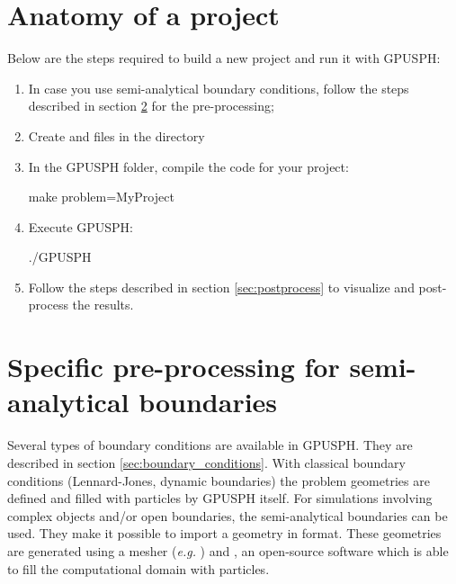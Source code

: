 \documentclass[12pt]{memoir}
\begin{document}

\section{Anatomy of a project}

Below are the steps required to build a new project and run it with GPUSPH:
\begin{enumerate}
\item In case you use semi-analytical boundary conditions, follow the steps 
described in section \ref{sec:preprocess_sa} for the pre-processing;
\item Create  and  files in 
the  directory
\item In the GPUSPH folder, compile the code for your project:
\begin{shellcode}
make problem=MyProject
\end{shellcode}
\item Execute GPUSPH:
\begin{shellcode}
./GPUSPH
\end{shellcode}
\item Follow the steps described in section \ref{sec:postprocess} 
to visualize and post-process the results.
\end{enumerate}

\section{Specific pre-processing for semi-analytical boundaries}\label{sec:preprocess_sa}

Several types of boundary conditions are available in GPUSPH. 
They are described in section \ref{sec:boundary_conditions}.
With classical boundary conditions (Lennard-Jones, dynamic boundaries) the problem 
geometries are defined and filled with particles by GPUSPH itself.
For simulations involving complex objects and/or open boundaries, 
the semi-analytical boundaries can be used. They make it possible 
to import a geometry in  format. These geometries are 
generated using a mesher (\textit{e.g.} ) and ,
an open-source software which is able to fill the computational 
domain with particles. 
\end{document}
